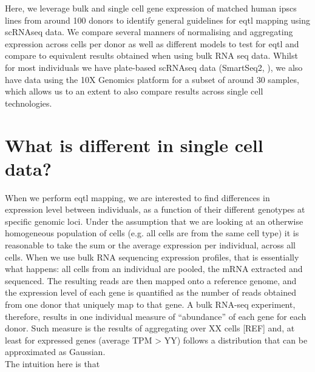 Here, we leverage bulk and single cell gene expression of matched human \gls{ipsc}s lines from around 100 donors to identify general guidelines for \gls{eqtl} mapping using scRNAseq data.
We compare several manners of normalising and aggregating expression across cells per donor as well as different models to test for \gls{eqtl} and compare to equivalent results obtained when using bulk RNA seq data.
Whilst for most individuals we have plate-based scRNAseq data (SmartSeq2, \cite{picelli2013smart}), we also have data using the 10X Genomics platform \cite{} for a subset of around 30 samples, which allows us to an extent to also compare results across single cell technologies.\\

\section{What is different in single cell data?}

When we perform \gls{eqtl} mapping, we are interested to find differences in expression level between individuals, as a function of their different genotypes at specific genomic loci. 
Under the assumption that we are looking at an otherwise homogeneous population of cells (e.g. all cells are from the same cell type) it is reasonable to take the sum or the average expression per individual, across all cells.
When we use bulk RNA sequencing expression profiles, that is essentially what happens: all cells from an individual are pooled, the mRNA extracted and sequenced. 
The resulting reads are then mapped onto a reference genome, and the expression level of each gene is quantified as the number of reads obtained from one donor that uniquely map to that gene. 
A bulk RNA-seq experiment, therefore, results in one individual measure of “abundance” of each gene for each donor. 
Such measure is the results of aggregating over XX cells [REF] and, at least for expressed genes (average TPM > YY) follows a distribution that can be approximated as Gaussian.\\

The intuition here is that 

